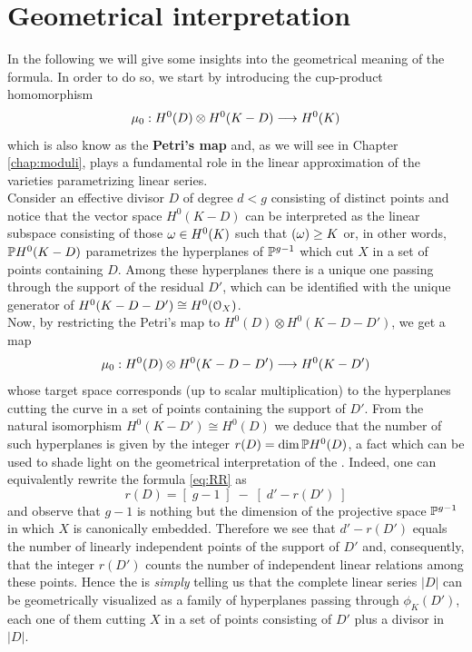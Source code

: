 \section{Geometrical interpretation}

	In the following we will give some insights into the geometrical meaning of the \RR formula. In order to do so, we start by introducing the cup-product homomorphism
	$$ \mu_0: H^0(D)\otimes H^0(K-D) \longrightarrow H^0(K) $$ 
	which is also know as the \textbf{Petri's map} and, as we will see in Chapter \ref{chap:moduli}, plays a fundamental role in the linear approximation of the varieties \moduu parametrizing linear series.\\

	Consider an effective divisor $D$ of degree $d<g$ consisting of distinct points and notice that the vector space $H^0(K-D)$ can be interpreted as the linear subspace consisting of those $\omega\in H^0(K)$ such that $(\omega)\geq K$ or, in other words, $\mathbb{P} H^0(K-D)$ parametrizes the hyperplanes of $\mathbb{P}^{g-1}$ which cut $X$ in a set of points containing $D$. Among these hyperplanes there is a unique one passing through the support of the residual $D'$, which can be identified with the unique generator of $H^0(K-D-D')\cong H^0(\mathcal{O}_X)$.\\ 
	Now, by restricting the Petri's map to $H^0(D)\otimes H^0(K-D-D')$, we get a map
	$$ \mu_0: H^0(D)\otimes H^0(K-D-D') \longrightarrow H^0(K-D') $$
	whose target space corresponds (up to scalar multiplication) to the hyperplanes cutting the curve in a set of points containing the support of $D'$. From the natural isomorphism $H^0(K-D')\cong H^0(D)$ we deduce that the number of such hyperplanes is given by the integer $r(D) = \dim \mathbb{P} H^0(D)$, a fact which can be used to shade light on the geometrical interpretation of the \RR. Indeed, one can equivalently rewrite the formula \eqref{eq:RR} as
	$$ r(D) = [\;g-1\;] \; - \; [\;d'-r(D')\;] $$
	and observe that $g-1$ is nothing but the dimension of the projective space $\mathbb{P}^{g-1}$ in which $X$ is canonically embedded. Therefore we see that $d'-r(D')$ equals the number of linearly independent points of the support of $D'$ and, consequently, that the integer $r(D')$ counts the number of independent linear relations among these points. Hence the \RR is \emph{simply} telling us that the complete linear series $|D|$ can be geometrically visualized as a family of hyperplanes passing through $\phi_K(D')$, each one of them cutting $X$ in a set of points consisting of $D'$ plus a divisor in $|D|$.

